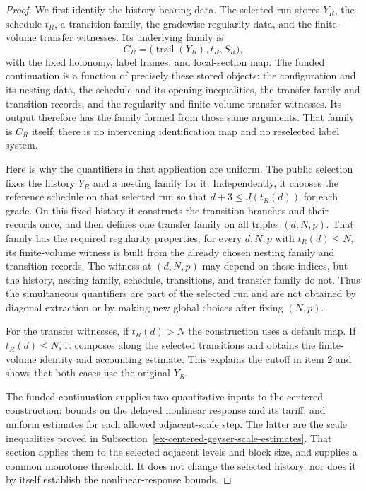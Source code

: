 \begin{proof}
We first identify the history-bearing data. The selected run stores $Y_R$,
the schedule $t_R$, a transition family, the gradewise regularity data, and
the finite-volume transfer witnesses. Its underlying family is
\[
 C_R=\bigl(\operatorname{trail}(Y_R),t_R,S_R\bigr),
\]
with the fixed holonomy, label frames, and local-section map. The funded
continuation is a function of precisely these stored objects: the
configuration and its nesting data, the schedule and its opening
inequalities, the transfer family and transition records, and the
regularity and finite-volume transfer witnesses. Its output therefore has
the family formed from those same arguments. That family is $C_R$ itself;
there is no intervening identification map and no reselected label system.

Here is why the quantifiers in that application are uniform. The public
selection fixes the history $Y_R$ and a nesting family for it.
Independently, it chooses the reference schedule on that selected run so
that $d+3\leq J(t_R(d))$ for each grade. On this fixed history it constructs
the transition branches and their records once, and then defines one
transfer family on all triples $(d,N,p)$. That family has the required
regularity properties; for every $d,N,p$ with $t_R(d)\leq N$, its
finite-volume witness is built from the already chosen nesting family and
transition records. The witness at $(d,N,p)$ may depend on those indices,
but the history, nesting family, schedule, transitions, and transfer family
do not. Thus the simultaneous quantifiers are part of the selected run and
are not obtained by diagonal extraction or by making new global choices
after fixing $(N,p)$.

For the transfer witnesses, if $t_R(d)>N$ the construction uses a default
map. If $t_R(d)\leq N$, it composes along the selected transitions and
obtains the finite-volume identity and accounting estimate. This explains
the cutoff in item 2 and shows that both cases use the original $Y_R$.

The funded continuation supplies two quantitative inputs to the centered
construction: bounds on the delayed nonlinear response and its tariff, and
uniform estimates for each allowed adjacent-scale step. The latter are the
scale inequalities proved in
Subsection~\ref{ex-centered-geyser-scale-estimates}. That section applies them
to the selected adjacent levels and block size, and supplies a common
monotone threshold. It does not change the selected history, nor does it
by itself establish the nonlinear-response bounds.


\end{proof}
